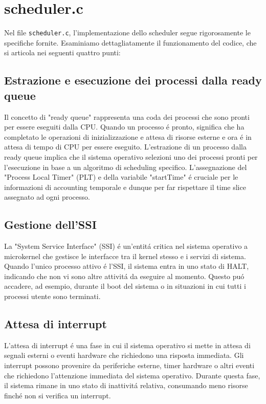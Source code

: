 \documentclass[a4paper]{article}
\begin{document}
\section{scheduler.c}
Nel file \texttt{scheduler.c}, l'implementazione dello scheduler segue rigorosamente le specifiche fornite. Esaminiamo dettagliatamente il funzionamento del codice, che si articola nei seguenti quattro punti:

\subsection{Estrazione e esecuzione dei processi dalla ready queue}
Il concetto di "ready queue" rappresenta una coda dei processi che sono pronti per essere eseguiti dalla CPU. Quando un processo \'e pronto, significa che ha completato le operazioni di inizializzazione e attesa di risorse esterne e ora \'e in attesa di tempo di CPU per essere eseguito. L'estrazione di un processo dalla ready queue implica che il sistema operativo selezioni uno dei processi pronti per l'esecuzione in base a un algoritmo di scheduling specifico. L'assegnazione del "Process Local Timer" (PLT) e della variabile "startTime" \'e cruciale per le informazioni di accounting temporale e dunque per far rispettare il time slice assegnato ad ogni processo.

\subsection{Gestione dell'SSI}
La "System Service Interface" (SSI) \'e un'entit\'a critica nel sistema operativo a microkernel che gestisce le interfacce tra il kernel stesso e i servizi di sistema. Quando l'unico processo attivo \'e l'SSI, il sistema entra in uno stato di HALT, indicando che non vi sono altre attivit\'a da eseguire al momento. Questo pu\'o accadere, ad esempio, durante il boot del sistema o in situazioni in cui tutti i processi utente sono terminati.

\subsection{Attesa di interrupt}
L'attesa di interrupt \'e una fase in cui il sistema operativo si mette in attesa di segnali esterni o eventi hardware che richiedono una risposta immediata. Gli interrupt possono provenire da periferiche esterne, timer hardware o altri eventi che richiedono l'attenzione immediata del sistema operativo. Durante questa fase, il sistema rimane in uno stato di inattivit\'a relativa, consumando meno risorse finché non si verifica un interrupt.
\end{document}
